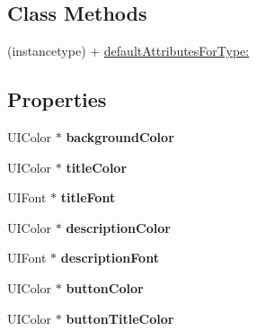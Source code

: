 \subsection*{Class Methods}
\begin{DoxyCompactItemize}
\item 
(instancetype) + \hyperlink{interface_f_b_native_ad_view_attributes_a7b3d079ff9b4fd2c0359fee0c06ce313}{default\-Attributes\-For\-Type\-:}
\end{DoxyCompactItemize}
\subsection*{Properties}
\begin{DoxyCompactItemize}
\item 
\hypertarget{interface_f_b_native_ad_view_attributes_ac0d31832c4450df2e71eb15768b88e90}{U\-I\-Color $\ast$ {\bfseries background\-Color}}\label{interface_f_b_native_ad_view_attributes_ac0d31832c4450df2e71eb15768b88e90}

\item 
\hypertarget{interface_f_b_native_ad_view_attributes_a63e813e9df1f82a4c02fd94204a164c2}{U\-I\-Color $\ast$ {\bfseries title\-Color}}\label{interface_f_b_native_ad_view_attributes_a63e813e9df1f82a4c02fd94204a164c2}

\item 
\hypertarget{interface_f_b_native_ad_view_attributes_ac73a6a4242f4722aff426f66c6463666}{U\-I\-Font $\ast$ {\bfseries title\-Font}}\label{interface_f_b_native_ad_view_attributes_ac73a6a4242f4722aff426f66c6463666}

\item 
\hypertarget{interface_f_b_native_ad_view_attributes_aeeb0bba48d6847120ef7ad3f250dda47}{U\-I\-Color $\ast$ {\bfseries description\-Color}}\label{interface_f_b_native_ad_view_attributes_aeeb0bba48d6847120ef7ad3f250dda47}

\item 
\hypertarget{interface_f_b_native_ad_view_attributes_a4f5da74365a306f9e39b352c94205804}{U\-I\-Font $\ast$ {\bfseries description\-Font}}\label{interface_f_b_native_ad_view_attributes_a4f5da74365a306f9e39b352c94205804}

\item 
\hypertarget{interface_f_b_native_ad_view_attributes_a0b55ac81fb747ed3a1861e047f51cbfb}{U\-I\-Color $\ast$ {\bfseries button\-Color}}\label{interface_f_b_native_ad_view_attributes_a0b55ac81fb747ed3a1861e047f51cbfb}

\item 
\hypertarget{interface_f_b_native_ad_view_attributes_adbff3c8f6eb0332f3c4ef5360c27a1e1}{U\-I\-Color $\ast$ {\bfseries button\-Title\-Color}}\label{interface_f_b_native_ad_view_attributes_adbff3c8f6eb0332f3c4ef5360c27a1e1}


\end{DoxyCompactItemize}
